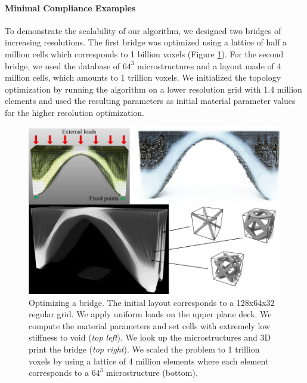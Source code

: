 		\paragraph{Minimal Compliance Examples}
		To demonstrate the scalability of our algorithm, we designed two bridges of increasing resolutions. The first bridge was optimized using a lattice of half a million cells which corresponds to 1 billion voxels (Figure \ref{fig:top_bridge}). For the second bridge, we used the database of $64^3$ microstructures and a layout made of 4 million cells, which amounts to 1 trillion voxels. We initialized the topology optimization by running the algorithm on a lower resolution grid with 1.4 million elements and used the resulting parameters as initial material parameter values for the higher resolution optimization.
		\begin{figure}
			\centering
			\includegraphics[width=.6\linewidth]{images/bridge_three.jpg}
			\caption{Optimizing a bridge. The initial layout corresponds to a 128x64x32 regular grid. We apply uniform loads on the upper plane deck. We compute the material parameters and set cells with extremely low stiffness to void (\emph{top left}). We look up the microstructures and 3D print the bridge (\emph{top right}). We scaled the problem to 1 trillion voxels by using a lattice of 4 million elements where each element corresponds to a $64^3$ microstructure (bottom).}
				\label{fig:top_bridge}
		\end{figure}